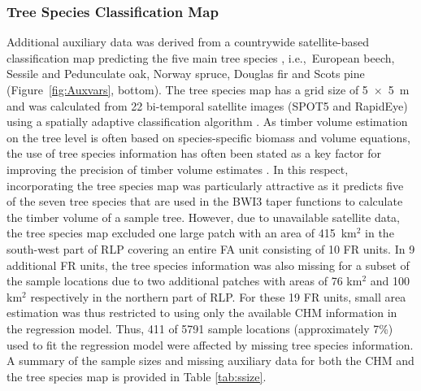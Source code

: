 \documentclass[remotesensing,article,accept,moreauthors,pdftex,10pt,a4paper]{Definitions/mdpi}
\begin{document}
\subsubsection{Tree Species Classification Map}
\label{sec:tspecclass}

Additional auxiliary data was derived from a countrywide satellite-based classification map predicting the five main tree species \citep{stoffels2015}, i.e.,~European beech, Sessile and Pedunculate oak, Norway spruce, Douglas fir and Scots pine (Figure~\ref{fig:Auxvars}, {bottom}). The tree species map has a grid size of \mbox{5 $\times$ 5 m} and was calculated from 22 bi-temporal satellite images (SPOT5 and RapidEye) using a spatially adaptive classification algorithm \citep{stoffels2012}. As timber volume estimation on the tree level is often based on species-specific biomass and volume equations, the use of tree species information has often been stated as a key factor for improving the precision of timber volume estimates \citep{white2016}. In this respect, incorporating the tree species map was particularly attractive as it predicts five of the seven tree species that are used in the BWI3 taper functions \citep{kublin2013} to calculate the timber volume of a sample tree. However, due to unavailable satellite data, the tree species map excluded one large patch with an area of 415~km$^2$ in the south-west part of RLP covering an entire FA unit consisting of 10 FR units. In 9 additional FR units, the tree species information was also missing for a subset of the sample locations due to two additional patches with areas of 76 km$^2$ and 100 km$^2$ respectively in the northern part of RLP. For these 19 FR units, small area estimation was thus restricted to using only the available CHM information in the regression model. Thus, 411 of 5791 sample locations (approximately 7\%) used to fit the regression model were affected by missing tree species information. A summary of the sample sizes and missing auxiliary data for both the CHM and the tree species map is provided in Table \ref{tab:ssize}.
\end{document}
